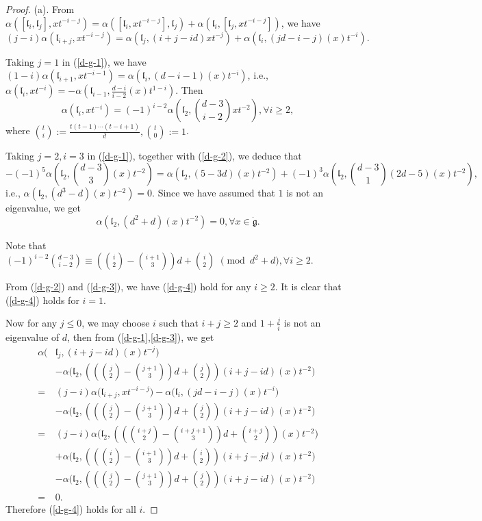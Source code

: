 \documentclass[1p]{elsarticle}
\numberwithin{equation}{section}
\def\dg{\dot{\mathfrak{g}}}
\def\bZ{\mathbb{Z}}
\def\fl{\mathfrak{l}}
\begin{document}
\begin{proof} (a). From $\alpha([\fl_i,\fl_j],xt^{-i-j})=\alpha([\fl_i,x t^{-i-j}],\fl_j)+\alpha(\fl_i,[\fl_j,x t^{-i-j}])$, we have
 \begin{equation}\label{d-g-1} (j-i)\alpha(\fl_{i+j},x t^{-i-j})=\alpha(\fl_j,(i+j-id)x t^{-j})+\alpha(\fl_i,(jd-i-j)(x) t^{-i}).\end{equation}


Taking $j=1$ in (\ref{d-g-1}), we have $(1-i)\alpha(\fl_{i+1},xt^{-i-1})=\alpha(\fl_i,(d-i-1)(x)t^{-i})$, i.e., $\alpha(\fl_{i},xt^{-i})=-\alpha(\fl_{i-1},\frac{d-i}{i-2}(x)t^{1-i})$. Then
\begin{equation}\label{d-g-2}\alpha(\fl_{i},xt^{-i})=(-1)^{i-2}\alpha(\fl_2,\binom{d-3}{i-2}xt^{-2}),\forall i\ge 2,\end{equation}
where $\binom{t}i:=\frac{t(t-1)\cdots(t-i+1)}{i!}, \binom{t}{0}:=1$.

Taking $j=2,i=3$ in (\ref{d-g-1}), together with (\ref{d-g-2}), we deduce that  $$-(-1)^5\alpha(\fl_2, \binom{d-3}{3}(x)t^{-2})=\alpha(\fl_2,(5-3d)(x)t^{-2})+(-1)^3 \alpha(\fl_2,\binom{d-3}{1}(2d-5)(x)t^{-2}),$$ i.e., $\alpha(\fl_2,(d^3-d)(x)t^{-2})=0$.
Since we have assumed that $1$ is not an eigenvalue, we get \begin{equation}\label{d-g-3}\alpha(\fl_2,(d^2+d)(x)t^{-2})=0,\forall x\in \dg.\end{equation}

Note that $(-1)^{i-2}\binom{d-3}{i-2}\equiv (\binom i2-\binom {i+1}3)d+\binom i2 \,\,\pmod{  d^2+d},\forall i\ge 2$.

From (\ref{d-g-2}) and (\ref{d-g-3}), we have (\ref{d-g-4}) hold for any $i\ge 2$. It is clear that (\ref{d-g-4}) holds for $i=1$.




Now for any  $j\le 0$, we may choose $i$ such that $i+j\ge 2$ and $1+\frac ji$ is not an eigenvalue of $d$, then from (\ref{d-g-1},\ref{d-g-3}), we get
\begin{equation*}\begin{aligned}\alpha(&\fl_j,(i+j-id)(x) t^{-j})\\ &-\alpha\Big (\fl_2,((\binom j2-\binom {j+1}3)d+\binom j2)(i+j-id)(x)t^{-2}\Big)\\ =&(j-i)\alpha\big(\fl_{i+j},x t^{-i-j})-\alpha(\fl_i,(jd-i-j)(x) t^{-i}\big)\\&-\alpha\big(\fl_2,((\binom j2-\binom {j+1}3)d+\binom j2)(i+j-id)(x)t^{-2}\big)\\
=&(j-i)\alpha\big(\fl_2,((\binom {i+j}2-\binom {i+j+1}3)d+\binom {i+j}2)(x)t^{-2}\big)\\ &+\alpha\big(\fl_2,((\binom i2-\binom {i+1}3)d+\binom i2)(i+j-jd)(x)t^{-2}\big)\\
 &-\alpha\big(\fl_2,((\binom j2-\binom {j+1}3)d+\binom j2)(i+j-id)(x)t^{-2}\big)\\
 =&0. \end{aligned}\end{equation*}
 Therefore (\ref{d-g-4}) holds for all $i$.


\end{proof}
\end{document}
